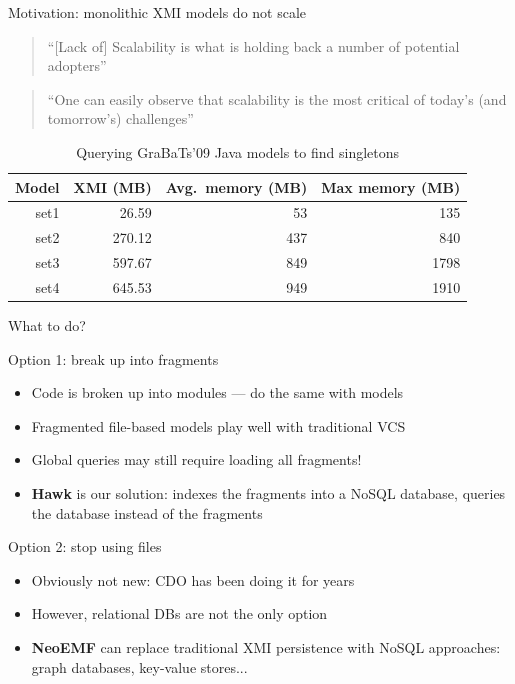 \documentclass[10pt]{beamer}
\begin{document}
\begin{frame}{Motivation: monolithic XMI models do not scale}
\centering

\begin{quote}
``[Lack of] Scalability is what is holding back a number of potential adopters''~\cite{Barmpis2013}
\end{quote}

\begin{quote}
``One can easily observe that scalability is the most critical of today's (and tomorrow's) challenges''~\cite{Mougenot2009}
\end{quote}

\begin{table}
\begin{tabular}{rrrr}
\toprule
Model & XMI (MB) & Avg.\ memory (MB) & Max memory (MB) \\
\midrule
set1 & 26.59 & 53 & 135 \\
set2 & 270.12 & 437 & 840 \\
set3 & 597.67 & 849 & 1798 \\
set4 & 645.53 & 949 & 1910 \\
\bottomrule
\end{tabular}

\caption{Querying GraBaTs'09 Java models to find singletons}
\end{table}

\end{frame}

\begin{frame}{What to do?}

\begin{block}{Option 1: break up into fragments}
  \begin{itemize}
  \item Code is broken up into modules --- do the same with models
  \item Fragmented file-based models play well with traditional VCS
  \item Global queries may still require loading all fragments!
  \item \textbf{\alert{Hawk}} is our solution: indexes the fragments into a NoSQL database, queries the database instead of the fragments
  \end{itemize}
\end{block}

\begin{block}{Option 2: stop using files}
  \begin{itemize}
  \item Obviously not new: CDO has been doing it for years
  \item However, relational DBs are not the only option
  \item \textbf{\alert{NeoEMF}} can replace traditional XMI persistence with
    NoSQL approaches: graph databases, key-value stores...
  \end{itemize}
\end{block}

\end{frame}
\end{document}

